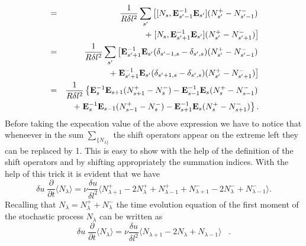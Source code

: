 \begin{eqnarray*}
[N_{\lambda},{\cal{A}}_d] &=&  \frac{1}{R \delta l^2} \sum_{s'}
                  \left[ [N_s,{\bf E}^{-1}_{s' - 1}{\bf E}_{s'}]
                              (N_{s'}^+ - N_{s'-1}^-)    \right. \\
               && + \left. [N_s,{\bf E}^{-1}_{s' + 1}{\bf E}_{s'}]
                        (N_{s'}^+ - N_{s'+1}^-)   \right]  \\
              & = &   \frac{1}{R \delta l^2} \sum_{s'}
                \left[ {\bf E}^{-1}_{s' + 1}{\bf E}_{s'} 
                        (\delta_{s'-1,s} - \delta_{s',s})  
                        (N_{s'}^+ -  N_{s'-1}^-)
                        \right. \\
                   && + \left. {\bf E}^{-1}_{s' + 1}{\bf E}_{s'}
                          (\delta_{s'+1,s} - \delta_{s',s})  
                         (N_{s'}^+ - N_{s'+1}^-)    \right]  \\
             & = & \frac{1}{R \delta l^2} 
                   \left\{  {\bf E}^{-1}_{s}{\bf E}_{s+1}
                           (N_{s+1}^+ -  N_{s}^-) 
                           - {\bf E}^{-1}_{s-1}{\bf E}_{s}
                           (N_{s}^+ -  N_{s-1}^-) 
                                \right. \\
            && +   \left.  {\bf E}^{-1}_{s}{\bf E}_{s-1}
                           (N_{s-1}^+ -  N_{s}^-)  
                        - {\bf E}^{-1}_{s+1}{\bf E}_{s}
                           (N_{s}^+ -  N_{s+1}^-)       \right\}.
\end{eqnarray*}
Before taking the expecation value of the above expression we have to notice
that wheneever in the sum $\sum_{\{ N_{ \lambda \} }}$ the shift operators appear
on the extreme left they can be replaced by 1. This is easy to show with the
help of the definition of the shift operators and by shifting  appropriately
the summation indices.
With the help of this trick it is evident that we have
\begin{equation}
\label{MOMENT3}
\delta u \; \frac{\partial}{\partial t}
\langle N_{\lambda} \rangle  = 
\nu \frac{\delta u}{ \delta l^2}
  \langle N_{\lambda +1}^+ - 2 N_{\lambda}^+ + N_{\lambda -1}^+ +
          N_{\lambda +1}^- - 2 N_{\lambda}^- + N_{\lambda -1}^-
          \rangle .
\end{equation}
Recalling that $N_{\lambda} = N_{\lambda}^+ + N_{\lambda}^-$ the
time evolution equation of the first moment of the stochastic
process
$N_{\lambda}$ can be written as
\begin{equation}
\label{MOMENT4}
\delta u \; \frac{\partial}{\partial t} \langle N_{\lambda}
\rangle =
\nu \frac{\delta u}{\delta l^2}
  \langle N_{\lambda +1} - 2 N_{\lambda} + N_{\lambda -1} \rangle
   \;\;\; .
\end{equation}
